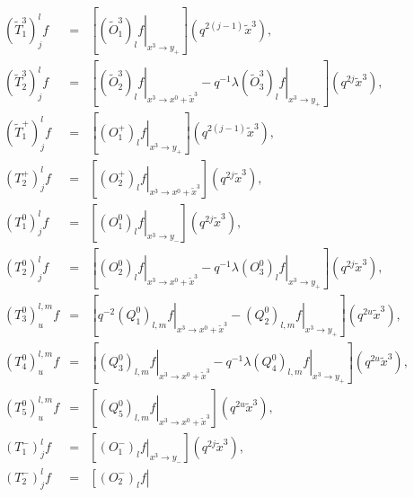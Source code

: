 \documentclass[a4paper,11pt,oneside]{article}
\begin{document}
\begin{eqnarray}
\left(\tilde{T}^3_1\right)_j^lf&=&\left[ \left. \left( \tilde{O}_{1}^{3}\right) _{l}f\right|
_{x^{3}\rightarrow y_{+}}\right] \left( q^{2\left( j-1\right) }\tilde{x}%
^{3}\right),\\
\left(\tilde{T}^3_2\right)_j^lf&=&\left[ \left. \left( \tilde{O}_{2}^{3}\right) _{l}f\right|
_{x^{3}\rightarrow x^{0}+\tilde{x}^{3}}-q^{-1}\lambda \left. \left( \tilde{O}%
_{3}^{3}\right) _{l}f\right| _{x^{3}\rightarrow y_{+}}\right] \left( q^{2j}%
\tilde{x}^{3}\right) ,\nonumber\\[.16in]
\left(\tilde{T}^+_1\right)_j^lf&=&\left[ \left. \left( O_{1}^{+}\right) _{l}f\right| _{x^{3}\rightarrow
y_{+}}\right] \left( q^{2\left( j-1\right) }\tilde{x}^{3}\right) ,\\
\left(T^+_2\right)^l_jf&=&\left[ \left. \left(
O_{2}^{+}\right) _{l}f\right| _{x^{3}\rightarrow x^{0}+\tilde{x}^{3}}\right]
\left( q^{2j}\tilde{x}^{3}\right) ,\nonumber\\[.16in]
\left(T^0_1\right)^l_jf&=&\left[ \left. \left( O_{1}^{0}\right) _{l}f\right| _{x^{3}\rightarrow
y_{-}}\right] \left( q^{2j}\tilde{x}^{3}\right),\\
\left(T^0_2\right)^l_jf&=&\left[ \left. \left(
O_{2}^{0}\right) _{l}f\right| _{x^{3}\rightarrow x^{0}+\tilde{x}%
^{3}}-q^{-1}\lambda \left. \left( O_{3}^{0}\right) _{l}f\right|
_{x^{3}\rightarrow y_{+}}\right] \left(
q^{2j}\tilde{x}^{3}\right),\nonumber\\
\left(T^0_3\right)^{l,m}_uf&=&\left[ q^{-2}\left. \left( Q_{1}^{0}\right)
_{l,m}f\right| _{x^{3}\rightarrow x^{0}+\tilde{x}^{3}}-\left. \left(
Q_{2}^{0}\right) _{l,m}f\right| _{x^{3}\rightarrow y_{+}}\right] \left(
q^{2u}\tilde{x}^{3}\right),\nonumber\\
\left(T^0_4\right)^{l,m}_uf&=&\left[ \left. \left( Q_{3}^{0}\right)
_{l,m}f\right| _{x^{3}\rightarrow x^{0}+\tilde{x}^{3}}-q^{-1}\lambda \left.
\left( Q_{4}^{0}\right) _{l,m}f\right| _{x^{3}\rightarrow y_{+}}\right]
\left( q^{2u}\tilde{x}^{3}\right),\nonumber\\
\left(T^0_5\right)^{l,m}_uf&=&\left[ \left. \left( Q_{5}^{0}\right)
_{l,m}f\right| _{x^{3}\rightarrow x^{0}+\tilde{x}^{3}}\right] \left( q^{2u}%
\tilde{x}^{3}\right),\nonumber\\[.16in]
\left(T^-_1\right)^l_jf&=&\left[ \left.
\left( O_{1}^{-}\right) _{l}f\right| _{x^{3}\rightarrow y_{-}}\right] \left(
q^{2j}\tilde{x}^{3}\right),\\
\left(T^-_2\right)^l_jf&=&\left[ \left. \left( O_{2}^{-}\right) _{l}f\right|

\end{eqnarray}
\end{document}
